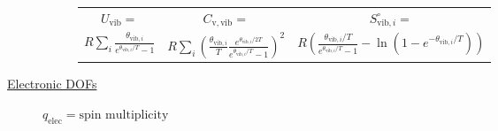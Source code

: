 \message{ !name(Outline.tex)}\documentclass[11pt]{article}
\begin{document}
\begin{outline}
\begin{table}
\begin{center}
\begin{description}
\begin{description}
\begin{tabular}{ccc}
$ U_\mathrm{vib}= $ & $  C_\mathrm{v,vib} = $ & $S^\circ_{\mathrm{vib},i}=$ \\
$\displaystyle
R\sum_i\frac{\theta_{\mathrm{vib},i}}{e^{\theta_{\mathrm{vib},i}/T}-1}$ &
$\displaystyle R \sum_i \left (
  \frac{\theta_{\mathrm{vib},i}}{T}\frac{e^{\theta_{\mathrm{vib},i}/2T}}{e^{\theta_{\mathrm{vib},i}/T}-1}
\right )^2 $ & $\displaystyle R \left ( \frac{\theta_{\mathrm{vib},i}/T}{e^{\theta_{\mathrm{vib},i}/T}-1}
-\ln(1-e^{-\theta_{\mathrm{vib},i}/T})\right ) $ \\
\end{tabular}

\end{description}
\item[\underline{Electronic DOFs}] {}
$q_\mathrm{elec} = \text{spin multiplicity}$


\end{description}
\end{center}
\end{table}



\end{outline}
\end{document}
